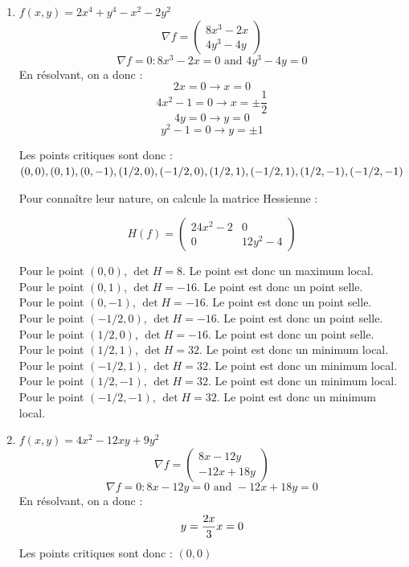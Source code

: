 \begin{solution}
\begin{enumerate}
        \item $f(x,y) = 2x^4 + y^4 - x^2 - 2y^2$
        \[
        \nabla f = \begin{pmatrix}
        8x^3 - 2x \\
        4y^3 - 4y
        \end{pmatrix}
        \]
        \[
        \nabla f = 0 : 8x^3 - 2x = 0 \text{ and } 4y^3 - 4y = 0
        \]
        En résolvant, on a donc : 
        \[
        2x = 0 \rightarrow x = 0 
        \]
        \[ 
        4x^2 - 1 = 0 \rightarrow x = \pm \frac{1}{2}
        \]
        \[
        4y = 0 \rightarrow y = 0
        \]
        \[
        y^2 - 1 = 0 \rightarrow y = \pm 1
        \]

        Les points critiques sont donc : $(0,0), (0,1), (0,-1),(1/2,0), (-1/2, 0), (1/2,1), \\ (-1/2, 1), (1/2,-1), (-1/2, -1)$

        Pour connaître leur nature, on calcule la matrice Hessienne :

        \[ H(f) = \begin{pmatrix}
        24x^2 - 2 & 0 \\
        0 & 12y^2 - 4
        \end{pmatrix}
        \]

        Pour le point $(0,0)$, $\det H = 8$. Le point est donc un maximum local. \\
        Pour le point $(0,1)$, $\det H = -16$. Le point est donc un point selle. \\
        Pour le point $(0,-1)$, $\det H = -16$. Le point est donc un point selle. \\
        Pour le point $(-1/2, 0)$, $\det H = -16$. Le point est donc un point selle. \\
        Pour le point $(1/2,0)$, $\det H = -16$. Le point est donc un point selle. \\
        Pour le point $(1/2,1)$, $\det H = 32$. Le point est donc un minimum local. \\
        Pour le point $(-1/2,1)$, $\det H = 32$. Le point est donc un minimum local. \\
        Pour le point $(1/2,-1)$, $\det H = 32$. Le point est donc un minimum local. \\
        Pour le point $(-1/2,-1)$, $\det H = 32$. Le point est donc un minimum local. \\
        
        \item $f(x,y) = 4x^2 - 12xy + 9y^2$
        \[
        \nabla f = \begin{pmatrix}
        8x - 12y \\
        -12x + 18y
        \end{pmatrix}
        \]
        \[
        \nabla f = 0 : 8x - 12y = 0 \text{ and } -12x + 18y = 0
        \]
        En résolvant, on a donc : 
        \[
        y = \frac{2x}{3} \\
        x = 0
        \]
        Les points critiques sont donc : $(0,0)$


\end{enumerate}
\end{solution}

